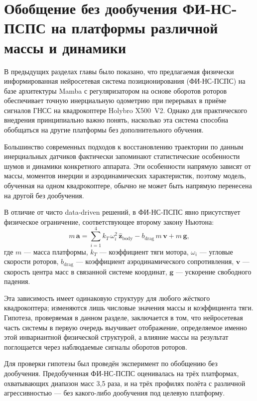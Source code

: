 
\section{Обобщение без дообучения ФИ-НС-ПСПС на платформы различной массы и динамики}
\label{sec:mp_crossplatform}

В предыдущих разделах главы было показано, что предлагаемая физически информированная нейросетевая система позиционирования (ФИ-НС-ПСПС) на базе архитектуры Mamba с регуляризатором на основе оборотов роторов обеспечивает точную инерциальную одометрию при перерывах в приёме сигналов ГНСС на квадрокоптере Holybro X500~V2. Однако для практического внедрения принципиально важно понять, насколько эта система способна обобщаться на другие платформы без дополнительного обучения. 

Большинство современных подходов к восстановлению траектории по данным инерциальных датчиков фактически запоминают статистические особенности шумов и динамики конкретного аппарата. Эти особенности напрямую зависят от массы, моментов инерции и аэродинамических характеристик, поэтому модель, обученная на одном квадрокоптере, обычно не может быть напрямую перенесена на другой без дообучения. 

В отличие от чисто data-driven решений, в ФИ-НС-ПСПС явно присутствует физическое ограничение, соответствующее второму закону Ньютона:
\begin{equation}
	m\,\mathbf{a} =
	\sum_{i=1}^{4} k_T\,\omega_i^2\,\hat{\mathbf{z}}_{\mathrm{body}}
	- b_{\mathrm{drag}}\,m\,\mathbf{v}
	+ m\,\mathbf{g},
	\label{eq:newton_full}
\end{equation}
где $m$ — масса платформы, $k_T$ — коэффициент тяги мотора, $\omega_i$ — угловые скорости роторов, $b_{\mathrm{drag}}$ — коэффициент аэродинамического сопротивления, $\mathbf{v}$ — скорость центра масс в связанной системе координат, $\mathbf{g}$ — ускорение свободного падения. 

Эта зависимость имеет одинаковую структуру для любого жёсткого квадрокоптера; изменяются лишь числовые значения массы и коэффициента тяги. Гипотеза, проверяемая в данном разделе, заключается в том, что нейросетевая часть системы в первую очередь выучивает отображение, определяемое именно этой инвариантной физической структурой, а влияние массы на результат поглощается через наблюдаемые сигналы оборотов роторов.

Для проверки гипотезы был проведён эксперимент по обобщению без дообучения. Предобученная ФИ-НС-ПСПС оценивалась на трёх платформах, охватывающих диапазон масс 3,5 раза, и на трёх профилях полёта с различной агрессивностью — без какого-либо дообучения под целевую платформу. 

